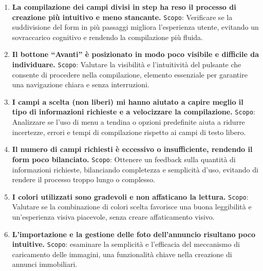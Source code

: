 \begin{enumerate}
    \item \textbf{La compilazione dei campi divisi in step ha reso il processo di creazione più intuitivo e meno stancante.}
    \newline
    \texttt{Scopo}: Verificare se la suddivisione del form in più passaggi migliora l’esperienza utente, evitando un sovraccarico cognitivo e rendendo la compilazione più fluida.

    \item \textbf{Il bottone “Avanti” è posizionato in modo poco visibile e difficile da individuare.}
    \newline
    \texttt{Scopo}: Valutare la visibilità e l’intuitività del pulsante che consente di procedere nella compilazione, elemento essenziale per garantire una navigazione chiara e senza interruzioni.

    \item \textbf{I campi a scelta (non liberi) mi hanno aiutato a capire meglio il tipo di informazioni richieste e a velocizzare la compilazione.}
    \newline
    \texttt{Scopo}: Analizzare se l’uso di menu a tendina o opzioni predefinite aiuta a ridurre incertezze, errori e tempi di compilazione rispetto ai campi di testo libero.

    
    \item \textbf{Il numero di campi richiesti è eccessivo o insufficiente, rendendo il form poco bilanciato.}
    \newline
    \texttt{Scopo}: Ottenere un feedback sulla quantità di informazioni richieste, bilanciando completezza e semplicità d’uso, evitando di rendere il processo troppo lungo o complesso.

    \item \textbf{I colori utilizzati sono gradevoli e non affaticano la lettura.}
    \newline
    \texttt{Scopo}: Valutare se la combinazione di colori scelta favorisce una buona leggibilità e un’esperienza visiva piacevole, senza creare affaticamento visivo.

    \item \textbf{L’importazione e la gestione delle foto dell’annuncio risultano poco intuitive.}
    \newline
    \texttt{Scopo}: esaminare la semplicità e l’efficacia del meccanismo di caricamento delle immagini, una funzionalità chiave nella creazione di annunci immobiliari.


\end{enumerate}
